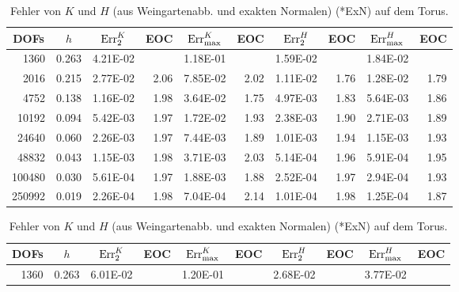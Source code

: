 \begin{beispiel}[Torus]
\begin{table}[htbp]
      \begin{tabular}{|r|r|r|r|r|r|r|r|r|r|}
      \hline
      \multicolumn{1}{|c|}{DOFs} & \multicolumn{1}{c|}{\( h \)} & \multicolumn{1}{c|}{\( \text{Err}_{2}^{K} \)} & \multicolumn{1}{c|}{EOC} & 
        \multicolumn{1}{c|}{\( \text{Err}_{\max}^{K} \)} & \multicolumn{1}{c|}{EOC} & \multicolumn{1}{c|}{\( \text{Err}_{2}^{H} \)} &
        \multicolumn{1}{c|}{EOC} & \multicolumn{1}{c|}{\( \text{Err}_{\max}^{H} \)} & \multicolumn{1}{c|}{EOC} \\ \hline
        1360 & 0.263 & 4.21E-02 & \multicolumn{1}{l|}{} & 1.18E-01 & \multicolumn{1}{l|}{} & 1.59E-02 & \multicolumn{1}{l|}{} & 1.84E-02 & \multicolumn{1}{l|}{} \\ \hline
2016 & 0.215 & 2.77E-02 & 2.06 & 7.85E-02 & 2.02 & 1.11E-02 & 1.76 & 1.28E-02 & 1.79 \\ \hline
4752 & 0.138 & 1.16E-02 & 1.98 & 3.64E-02 & 1.75 & 4.97E-03 & 1.83 & 5.64E-03 & 1.86 \\ \hline
10192 & 0.094 & 5.42E-03 & 1.97 & 1.72E-02 & 1.93 & 2.38E-03 & 1.90 & 2.71E-03 & 1.89 \\ \hline
24640 & 0.060 & 2.26E-03 & 1.97 & 7.44E-03 & 1.89 & 1.01E-03 & 1.94 & 1.15E-03 & 1.93 \\ \hline
48832 & 0.043 & 1.15E-03 & 1.98 & 3.71E-03 & 2.03 & 5.14E-04 & 1.96 & 5.91E-04 & 1.95 \\ \hline
100480 & 0.030 & 5.61E-04 & 1.97 & 1.88E-03 & 1.88 & 2.52E-04 & 1.97 & 2.94E-04 & 1.93 \\ \hline
250992 & 0.019 & 2.26E-04 & 1.98 & 7.04E-04 & 2.14 & 1.01E-04 & 1.98 & 1.25E-04 & 1.87 \\ \hline
      \end{tabular}
      \caption[Gauß-/mittlere Krümmung aus Weingartenabb. auf Torus (ExN)]{Fehler von \( K \) und \( H \) (aus Weingartenabb. und
      exakten Normalen) (*ExN) auf dem Torus.}
      \label{tabWeingartenFehlerTorusExN}
      \vspace{10pt}
      \begin{tabular}{|r|r|r|r|r|r|r|r|r|r|}
      \hline
      \multicolumn{1}{|c|}{DOFs} & \multicolumn{1}{c|}{\( h \)} & \multicolumn{1}{c|}{\( \text{Err}_{2}^{K} \)} & \multicolumn{1}{c|}{EOC} & 
        \multicolumn{1}{c|}{\( \text{Err}_{\max}^{K} \)} & \multicolumn{1}{c|}{EOC} & \multicolumn{1}{c|}{\( \text{Err}_{2}^{H} \)} &
        \multicolumn{1}{c|}{EOC} & \multicolumn{1}{c|}{\( \text{Err}_{\max}^{H} \)} & \multicolumn{1}{c|}{EOC} \\ \hline
      1360 & 0.263 & 6.01E-02 & \multicolumn{1}{l|}{} & 1.20E-01 & \multicolumn{1}{l|}{} & 2.68E-02 & \multicolumn{1}{l|}{} & 3.77E-02 & \multicolumn{1}{l|}{} \\ \hline

\end{tabular}
\end{table}
\end{beispiel}
